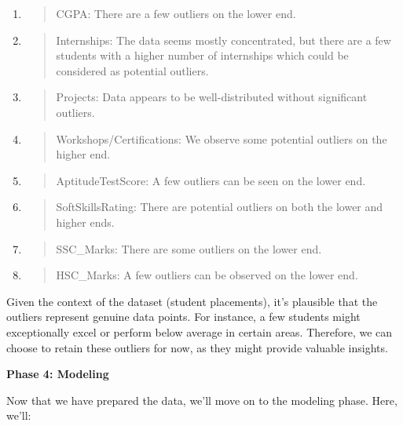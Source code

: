 \documentclass[]{article}
\newcommand{\textcenter}[1]{\begin{center} \vspace{10px}\textbf{\large #1} \end{center}}
\begin{document}
\begin{enumerate}
\def\labelenumi{\arabic{enumi}.}
\item
  \begin{quote}
  CGPA: There are a few outliers on the lower end.
  \end{quote}
\item
  \begin{quote}
  Internships: The data seems mostly concentrated, but there are a few
  students with a higher number of internships which could be considered
  as potential outliers.
  \end{quote}
\item
  \begin{quote}
  Projects: Data appears to be well-distributed without significant
  outliers.
  \end{quote}
\item
  \begin{quote}
  Workshops/Certifications: We observe some potential outliers on the
  higher end.
  \end{quote}
\item
  \begin{quote}
  AptitudeTestScore: A few outliers can be seen on the lower end.
  \end{quote}
\item
  \begin{quote}
  SoftSkillsRating: There are potential outliers on both the lower and
  higher ends.
  \end{quote}
\item
  \begin{quote}
  SSC\_Marks: There are some outliers on the lower end.
  \end{quote}
\item
  \begin{quote}
  HSC\_Marks: A few outliers can be observed on the lower end.
  \end{quote}
\end{enumerate}

Given the context of the dataset (student placements), it's plausible
that the outliers represent genuine data points. For instance, a few
students might exceptionally excel or perform below average in certain
areas. Therefore, we can choose to retain these outliers for now, as
they might provide valuable insights.

\textcenter{Phase 4: Modeling}

Now that we have prepared the data, we'll move on to the modeling phase.
Here, we'll:
\end{document}
